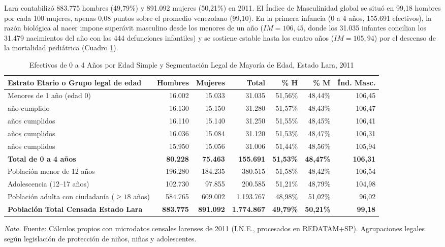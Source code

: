 \documentclass[12pt,letterpaper]{article}
\begin{document}
Lara contabilizó 883.775 hombres (49,79\%) y 891.092 mujeres (50,21\%) en 2011. El Índice de Masculinidad global se situó en 99,18 hombres por cada 100 mujeres, apenas 0,08 puntos sobre el promedio venezolano (99,10). En la primera infancia (0 a 4 años, 155.691 efectivos), la razón biológica al nacer impone superávit masculino desde los menores de un año ($IM = 106,45$, donde los 31.035 infantes concilian los 31.479 nacimientos del año con las 444 defunciones infantiles) y se sostiene estable hasta los cuatro años ($IM = 105,94$) por el descenso de la mortalidad pediátrica (Cuadro \ref{tab:edades_simples_tramos}).

\begin{table}[htbp]
    \centering
    \caption{Efectivos de 0 a 4 Años por Edad Simple y Segmentación Legal de Mayoría de Edad, Estado Lara, 2011}
    \label{tab:edades_simples_tramos}
    \small
    \begin{tabularx}{\textwidth}{>{\raggedright\arraybackslash}Xrrrrrr}
        \toprule
        \textbf{Estrato Etario o Grupo legal de edad} & \textbf{Hombres} & \textbf{Mujeres} & \textbf{Total} & \textbf{\% H} & \textbf{\% M} & \textbf{Índ. Masc.} \\
        \midrule
        Menores de 1 año (edad 0) & 16.002 & 15.033 & 31.035 & 51,56\% & 48,44\% & 106,45 \\
        1 año cumplido & 16.130 & 15.150 & 31.280 & 51,57\% & 48,43\% & 106,47 \\
        2 años cumplidos & 16.110 & 15.140 & 31.250 & 51,55\% & 48,45\% & 106,41 \\
        3 años cumplidos & 16.036 & 15.084 & 31.120 & 51,53\% & 48,47\% & 106,31 \\
        4 años cumplidos & 15.950 & 15.056 & 31.006 & 51,44\% & 48,56\% & 105,94 \\
        \midrule
        \textbf{Total de 0 a 4 años} & \textbf{80.228} & \textbf{75.463} & \textbf{155.691} & \textbf{51,53\%} & \textbf{48,47\%} & \textbf{106,31} \\
        \midrule
        Población menor de 12 años & 196.280 & 184.235 & 380.515 & 51,58\% & 48,42\% & 106,54 \\
        Adolescencia (12--17 años) & 102.730 & 97.855 & 200.585 & 51,21\% & 48,79\% & 104,98 \\
        Población adulta con ciudadanía ($\ge 18$ años) & 584.765 & 609.002 & 1.193.767 & 48,98\% & 51,02\% & 96,02 \\
        \midrule
        \textbf{Población Total Censada Estado Lara} & \textbf{883.775} & \textbf{891.092} & \textbf{1.774.867} & \textbf{49,79\%} & \textbf{50,21\%} & \textbf{99,18} \\
        \bottomrule
    \end{tabularx}
    \par\vspace{2pt}\noindent\raggedright \scriptsize \textit{Nota.} Fuente: Cálculos propios con microdatos censales larenses de 2011 (I.N.E., procesados en REDATAM+SP). Agrupaciones legales según legislación de protección de niños, niñas y adolescentes.
\end{table}
\end{document}
